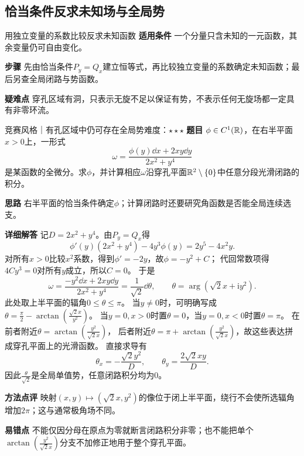 \subsection{恰当条件反求未知场与全局势}\label{cf:inverse}
\begin{method}{用独立变量的系数比较反求未知函数}
\textbf{适用条件} 一个分量只含未知的一元函数，其余变量仍可自由变化。\par
\textbf{步骤} 先由恰当条件$P_y=Q_x$建立恒等式，再比较独立变量的系数确定未知函数；最后另查全局闭路与势函数。\par
\textbf{疑难点} 穿孔区域有洞，只表示无旋不足以保证有势，不表示任何无旋场都一定具有非零环流。
\end{method}
\begin{example}{竞赛风格｜有孔区域中仍可存在全局势}{难度：$\star\star\star$}
\label{cf:ex:inverse}
\textbf{题目} $\phi\in C^1(\mathbb{R})$，在右半平面$x>0$上，一形式
\[
\omega=\dfrac{\phi(y)\dd x+2xy\dd y}{2x^2+y^4}
\]
是某函数的全微分。求$\phi$，并计算相应$\omega$沿穿孔平面$\mathbb{R}^2\setminus\{0\}$中任意分段光滑闭路的积分。\par
\textbf{思路} 右半平面的恰当条件确定$\phi$；计算闭路时还要研究角函数是否能全局连续选支。\par
\textbf{详细解答} 记$D=2x^2+y^4$。由$P_y=Q_x$得
\[
\phi'(y)(2x^2+y^4)-4y^3\phi(y)=2y^5-4x^2y.
\]
对所有$x>0$比较$x^2$系数，得到$\phi'=-2y$，故$\phi=-y^2+C$；
代回常数项得$4Cy^3=0$对所有$y$成立，所以$C=0$。
于是
\[
\omega=\dfrac{-y^2\dd x+2xy\dd y}{2x^2+y^4}
=\dfrac1{\sqrt2}\dd\theta,\qquad
\theta=\arg(\sqrt2x+\mathrm{i}y^2).
\]
此处取上半平面的辐角$0\le\theta\le\pi$。
当$y\ne0$时，可明确写成
$\theta=\frac{\pi}{2}-\arctan(\frac{\sqrt2x}{y^2})$。
当$y=0,x>0$时置$\theta=0$，当$y=0,x<0$时置$\theta=\pi$。
在前者附近$\theta=\arctan(\frac{y^2}{\sqrt2x})$，
后者附近$\theta=\pi+\arctan(\frac{y^2}{\sqrt2x})$，故这些表达拼成穿孔平面上的光滑函数。
直接求导有
\[
\theta_x=-\dfrac{\sqrt2y^2}{D},\qquad
\theta_y=\dfrac{2\sqrt2xy}{D}.
\]
因此$\frac{\theta}{\sqrt2}$是全局单值势，任意闭路积分均为$0$。\par
\textbf{方法点评} 映射$(x,y)\mapsto(\sqrt2x,y^2)$的像位于闭上半平面，绕行不会使所选辐角增加$2\pi$；这与通常极角场不同。\par
\textbf{易错点} 不能仅因分母在原点为零就断言闭路积分非零；也不能把单个$\arctan(\frac{y^2}{\sqrt2x})$分支不加修正地用于整个穿孔平面。
\end{example}
